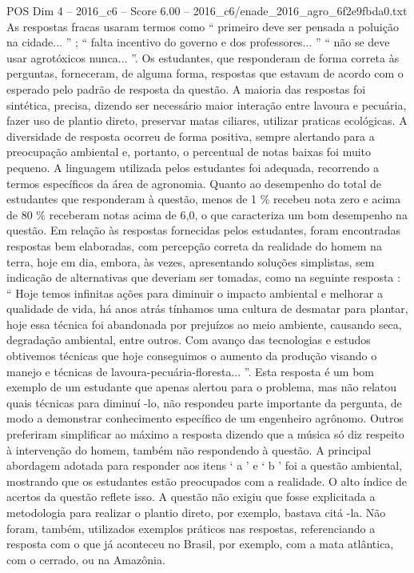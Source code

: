 \begin{textsample}{POS Dim 4 – 2016\_c6 – Score 6.00 – 2016\_c6/enade\_2016\_agro\_6f2e9fbda0.txt}
As respostas fracas usaram termos como “ primeiro deve ser pensada a poluição na cidade... ” ; “ falta incentivo do governo e dos professores... ” “ não se deve usar agrotóxicos nunca... ”.
Os estudantes, que responderam de forma correta às perguntas, forneceram, de alguma forma, respostas que estavam de acordo com o esperado pelo padrão de resposta da questão.
A maioria das respostas foi sintética, precisa, dizendo ser necessário maior interação entre lavoura e pecuária, fazer uso de plantio direto, preservar matas ciliares, utilizar praticas ecológicas.
A diversidade de resposta ocorreu de forma positiva, sempre alertando para a preocupação ambiental e, portanto, o percentual de notas baixas foi muito pequeno.
A linguagem utilizada pelos estudantes foi adequada, recorrendo a termos específicos da área de agronomia.
Quanto ao desempenho do total de estudantes que responderam à questão, menos de 1 \% recebeu nota zero e acima de 80 \% receberam notas acima de 6,0, o que caracteriza um bom desempenho na questão.
Em relação às respostas fornecidas pelos estudantes, foram encontradas respostas bem elaboradas, com percepção correta da realidade do homem na terra, hoje em dia, embora, às vezes, apresentando soluções simplistas, sem indicação de alternativas que deveriam ser tomadas, como na seguinte resposta : “ Hoje temos infinitas ações para diminuir o impacto ambiental e melhorar a qualidade de vida, há anos atrás tínhamos uma cultura de desmatar para plantar, hoje essa técnica foi abandonada por prejuízos ao meio ambiente, causando seca, degradação ambiental, entre outros.
Com avanço das tecnologias e estudos obtivemos técnicas que hoje conseguimos o aumento da produção visando o manejo e técnicas de lavoura-pecuária-floresta... ”.
Esta resposta é um bom exemplo de um estudante que apenas alertou para o problema, mas não relatou quais técnicas para diminuí -lo, não respondeu parte importante da pergunta, de modo a demonstrar conhecimento específico de um engenheiro agrônomo.
Outros preferiram simplificar ao máximo a resposta dizendo que a música só diz respeito à intervenção do homem, também não respondendo à questão.
A principal abordagem adotada para responder aos itens ‘ a ’ e ‘ b ’ foi a questão ambiental, mostrando que os estudantes estão preocupados com a realidade.
O alto índice de acertos da questão reflete isso.
A questão não exigiu que fosse explicitada a metodologia para realizar o plantio direto, por exemplo, bastava citá -la.
Não foram, também, utilizados exemplos práticos nas respostas, referenciando a resposta com o que já aconteceu no Brasil, por exemplo, com a mata atlântica, com o cerrado, ou na Amazônia.

\end{textsample}
